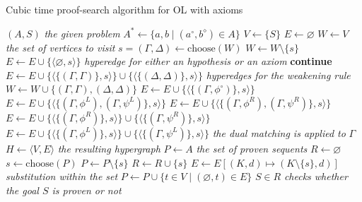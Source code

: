 \documentclass[a4paper, 11pt]{article}
\begin{document}
    \begin{algorithm}
	    \caption{Cubic time proof-search algorithm for OL with axioms}
	    \label{proof_search_algo}
    \begin{algorithmic}
	    \State $(A,S)$ \textit{the given problem}
	    \State $A^*\gets\{a,b\mid(a^\circ,b^\diamond)\in A\}$
	    \State $V\gets \{S\}$	
	    \State $E\gets\varnothing$
	    \State $W\gets V$ \textit{the set of vertices to visit}   
	    \State $s=(\Gamma,\Delta)\gets\text{choose}(W)$
	    \State $W\gets W\setminus\{s\}$
	    \State $E\gets E\cup\{\langle\varnothing,s\rangle\}$ 
	    \textit{hyperedge for either an hypothesis or an axiom}
	    \State\textbf{continue}
	    \EndIf
	    \State $E\gets E\cup\{\langle\{(\Gamma,\Gamma)\},s\rangle\}\cup
	    \{\langle\{(\Delta,\Delta)\},s\rangle\}$ \textit{hyperedges for the weakening rule}
	    \State $W\gets W\cup\{(\Gamma,\Gamma),(\Delta,\Delta)\}$
	    \If {$\Delta=\neg\phi^\circ$}
	    \State $E\gets E\cup\{\langle\{(\Gamma,\phi^\circ)\},s\rangle\}$
	    \State $E\gets E\cup\{\langle\{(\Gamma,\phi^L),(\Gamma,\psi^L)\},s\rangle\}$
	    \State $E\gets E\cup\{\langle\{(\Gamma,\phi^R),(\Gamma,\psi^R)\},s\rangle\}$
	    \State $E\gets E\cup\{\langle\{(\Gamma,\phi^R)\},s\rangle\}\cup
	    \{\langle\{(\Gamma,\psi^R)\},s\rangle\}$
	    \State $E\gets E\cup\{\langle\{(\Gamma,\phi^L)\},s\rangle\}\cup
	    \{\langle\{(\Gamma,\psi^L)\},s\rangle\}$
	    \EndIf
	    \State \textit{the dual matching is applied to }$\Gamma$ 
	    \EndWhile
	    \State $H\gets\langle V,E\rangle$ \textit{the resulting hypergraph}
	    \State $P\gets A$ \textit{the set of proven sequents}
	    \State $R\gets \varnothing$
	    \State $s\gets \text{choose}(P)$
	    \State $P\gets P\setminus\{s\}$
	    \State $R\gets R\cup\{s\}$
	    \State $E\gets E[(K,d)\mapsto (K\setminus\{s\},d)]$ \textit{substitution within the set}
	    \State $P\gets P\cup\{t\in V\mid(\varnothing,t)\in E\}$  
	    \EndWhile
	    \State \Return $S\in R$ \textit{checks whether the goal $S$ is proven or not}
    \end{algorithmic}
    \end{algorithm}
\end{document}
